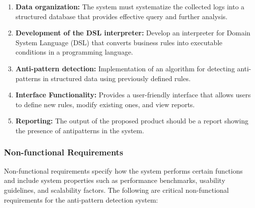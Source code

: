 \documentclass[12pt, times]{article}
\begin{document}
\begin{enumerate}
	\item \textbf {Data organization:} The system must systematize the collected logs into a structured database that provides effective query and further analysis.
	\item \textbf{Development of the DSL interpreter:} Develop an interpreter for Domain System Language (DSL) that converts business rules into executable conditions in a programming language.
	\item \textbf{Anti-pattern detection:} Implementation of an algorithm for detecting anti-patterns in structured data using previously defined rules.
	\item \textbf{Interface Functionality:} Provides a user-friendly interface that allows users to define new rules, modify existing ones, and view reports.
	\item \textbf{Reporting:} The output of the proposed product should be a report showing the presence of antipatterns in the system.
\end{enumerate}

\subsubsection{Non-functional Requirements}

\hspace*{5mm}Non-functional requirements specify how the system performs certain functions and include system properties such as performance benchmarks, usability guidelines, and scalability factors. The following are critical non-functional requirements for the anti-pattern detection system:
\end{document}
